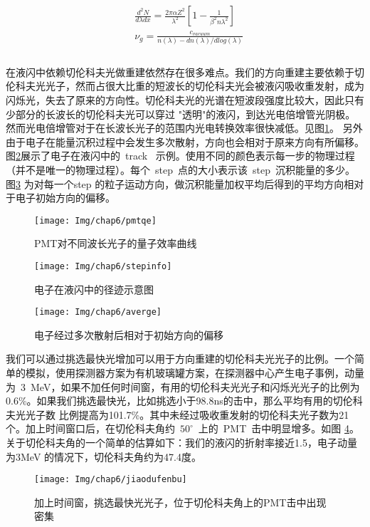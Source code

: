 \begin{equation}\label{eq:speed}
\begin{split}
&\frac{d^2N}{d\lambda dx}=\frac{2\pi\alpha Z^2}{\lambda^{2}}\left[1-\frac{1}{\beta^{2}n\lambda^{2}}\right]   \\
&\nu_g=\frac{c_{vacuum}}{n(\lambda)-dn(\lambda)/dlog(\lambda)}  \\
\end{split}
\end{equation}
\\
在液闪中依赖切伦科夫光做重建依然存在很多难点。我们的方向重建主要依赖于切伦科夫光光子，然而占很大比重的短波长的切伦科夫光会被液闪吸收重发射，成为闪烁光，失去了原来的方向性。切伦科夫光的光谱在短波段强度比较大，因此只有少部分的长波长的切伦科夫光可以穿过 "透明"的液闪，到达光电倍增管光阴极。然而光电倍增管对于在长波长光子的范围内光电转换效率很快减低。见图\ref{fig:pmtqe}。 另外由于电子在能量沉积过程中会发生多次散射，方向也会相对于原来方向有所偏移。图\ref{fig:stepinfo}展示了电子在液闪中的~track~ 示例。使用不同的颜色表示每一步的物理过程（并不是唯一的物理过程）。每个~step~点的大小表示该~step~沉积能量的多少。图\ref{fig:averge} 为对每一个step 的粒子运动方向，做沉积能量加权平均后得到的平均方向相对于电子初始方向的偏移。
\begin{figure}[!htbp]
  \centering
   \texttt{[image: Img/chap6/pmtqe]}
    \caption{PMT对不同波长光子的量子效率曲线}
  \label{fig:pmtqe}
\end{figure}
\begin{figure}[!htbp]
  \centering
   \texttt{[image: Img/chap6/stepinfo]}
    \caption{电子在液闪中的径迹示意图}
  \label{fig:stepinfo}
\end{figure}
\begin{figure}[!htbp]
  \centering
   \texttt{[image: Img/chap6/averge]}
    \caption{电子经过多次散射后相对于初始方向的偏移}
  \label{fig:averge}
\end{figure}

我们可以通过挑选最快光增加可以用于方向重建的切伦科夫光光子的比例。一个简单的模拟，使用探测器方案为有机玻璃罐方案，在探测器中心产生电子事例，动量为~3~MeV，如果不加任何时间窗，有用的切伦科夫光光子和闪烁光光子的比例为 %
0.6\%。如果我们挑选最快光，比如挑选小于98.8ns的击中，那么平均有用的切伦科夫光光子数%
比例提高为101.7\%。其中未经过吸收重发射的切伦科夫光子数为21个。加上时间窗口后，在切伦科夫角约~$50^{\circ}$~上的~PMT~击中明显增多。如图
\ref{fig:jiaodufenbu}。 关于切伦科夫角的一个简单的估算如下：我们的液闪的折射率接近1.5，电子动量为3MeV 的情况下，切伦科夫角约为47.4度。
\begin{figure}[!htbp]
  \centering
   \texttt{[image: Img/chap6/jiaodufenbu]}
    \caption{加上时间窗，挑选最快光光子，位于切伦科夫角上的PMT击中出现密集}
  \label{fig:jiaodufenbu}
\end{figure}
